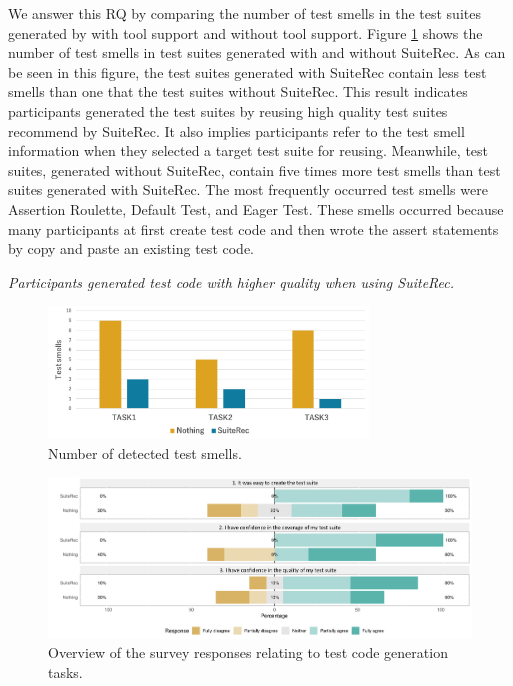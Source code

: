 \documentclass[conference]{IEEEtran}
\begin{document}
We answer this RQ by comparing the number of test smells in the test suites generated by with tool support and without tool support. Figure \ref{fig8} shows the number of test smells in test suites generated with and without \textsf{SuiteRec}. As can be seen in this figure, the test suites generated with \textsf{SuiteRec} contain less test smells than one that the test suites without \textsf{SuiteRec}. This result indicates participants generated the test suites by reusing high quality test suites recommend by \textsf{SuiteRec}. It also implies participants refer to the test smell information when they selected a target test suite for reusing. Meanwhile, test suites, generated without \textsf{SuiteRec}, contain five times more test smells than test suites generated with \textsf{SuiteRec}. The most frequently occurred test smells were Assertion Roulette, Default Test, and Eager Test. These smells occurred because many participants at first create test code and then wrote the assert statements by copy and paste an existing test code.
\begin{breakbox}
\textit{Participants generated test code with higher quality when using \textsf{SuiteRec}.}
\end{breakbox}


\begin{figure}[htbp]
\centerline{\includegraphics[width=8.5cm]{smells.pdf}}
\caption{Number of detected test smells.}
\label{fig8}
\end{figure}

\begin{figure}[t]
 \begin{center}
  \includegraphics[width=18.5cm]{qa.pdf}
  \caption{Overview of the survey responses relating to test code generation tasks.}
  \label{fig9}
 \end{center}
\end{figure}
\end{document}
